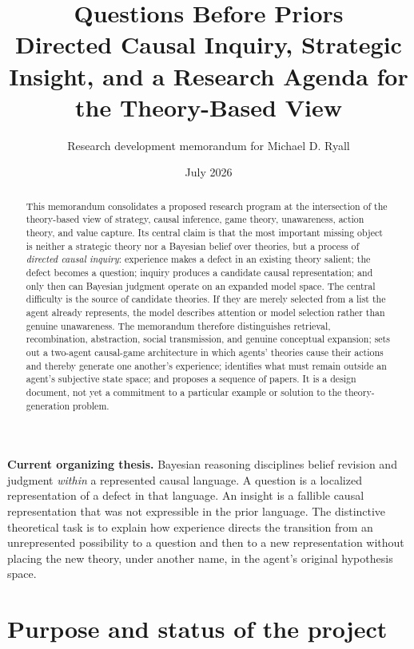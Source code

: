 \documentclass[11pt]{article}
\title{\textbf{Questions Before Priors}\\[0.35em]
	\large Directed Causal Inquiry, Strategic Insight, and a Research Agenda for the Theory-Based View}
\author{Research development memorandum for Michael D. Ryall}
\date{July 2026}
\begin{document}
	\maketitle
	
	\begin{abstract}
		This memorandum consolidates a proposed research program at the intersection of the theory-based view of strategy, causal inference, game theory, unawareness, action theory, and value capture.  Its central claim is that the most important missing object is neither a strategic theory nor a Bayesian belief over theories, but a process of \emph{directed causal inquiry}: experience makes a defect in an existing theory salient; the defect becomes a question; inquiry produces a candidate causal representation; and only then can Bayesian judgment operate on an expanded model space.  The central difficulty is the source of candidate theories.  If they are merely selected from a list the agent already represents, the model describes attention or model selection rather than genuine unawareness.  The memorandum therefore distinguishes retrieval, recombination, abstraction, social transmission, and genuine conceptual expansion; sets out a two-agent causal-game architecture in which agents' theories cause their actions and thereby generate one another's experience; identifies what must remain outside an agent's subjective state space; and proposes a sequence of papers.  It is a design document, not yet a commitment to a particular example or solution to the theory-generation problem.
	\end{abstract}
	
	\begin{thesisbox}
		\textbf{Current organizing thesis.}
		Bayesian reasoning disciplines belief revision and judgment \emph{within} a represented causal language.  A question is a localized representation of a defect in that language.  An insight is a fallible causal representation that was not expressible in the prior language.  The distinctive theoretical task is to explain how experience directs the transition from an unrepresented possibility to a question and then to a new representation without placing the new theory, under another name, in the agent's original hypothesis space.
	\end{thesisbox}
	
	\tableofcontents
	\newpage
	
	\section{Purpose and status of the project}
	
\end{document}
